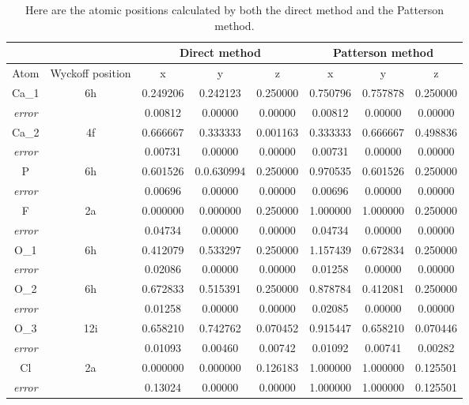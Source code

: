 \documentclass[]{scrartcl}
\begin{document}
\begin{table}[H]
	\centering
	\caption[Atomic positions]{Here are the atomic positions calculated by both the direct method and the Patterson method.}
	\begin{tabular}{c|c|c|c|c|c|c|c}
		&&\multicolumn{3}{c}{\cellcolor{Aquamarine} Direct method} & \multicolumn{3}{c}{\cellcolor{LimeGreen} Patterson method}\\
		\midrule
		Atom & Wyckoff position & x & y & z & x & y & z \\
		Ca\_1 & 6h & 0.249206 & 0.242123 & 0.250000 & 0.750796 & 0.757878 & 0.250000 \\
		\hline 
		\textit{error} & \ &  0.00812  &  0.00000  &  0.00000 &  0.00812  &  0.00000  &  0.00000   \\ 
		\hline
		
		Ca\_2 & 4f & 0.666667 & 0.333333 & 0.001163 & 0.333333 & 0.666667 & 0.498836 \\
		\hline
		\textit{error} & \ & 0.00731  &  0.00000 &   0.00000 & 0.00731  &  0.00000  &  0.00000 \\ 
		\hline
		P & 6h & 0.601526 & 0.0.630994 & 0.250000 & 0.970535 & 0.601526 & 0.250000 \\ 
		\hline
		\textit{error} & \ & 0.00696 &   0.00000 &   0.00000 & 0.00696 &   0.00000  &  0.00000 \\
		\hline
		F & 2a & 0.000000 & 0.000000 & 0.250000 & 1.000000 & 1.000000 & 0.250000 \\
		\hline
		\textit{error} & \ & 0.04734 &    0.00000 &   0.00000 & 0.04734 &   0.00000   & 0.00000 \\
		\hline 
		O\_1 & 6h & 0.412079 & 0.533297 & 0.250000 & 1.157439 & 0.672834 & 0.250000 \\
		\hline
		\textit{error} & \ & 0.02086 &   0.00000  &  0.00000 & 0.01258 &   0.00000 &   0.00000 \\
		\hline 
		O\_2 & 6h & 0.672833 & 0.515391 & 0.250000 & 0.878784 & 0.412081 & 0.250000 \\
		\hline
		\textit{error} & \ & 0.01258 &   0.00000 &   0.00000 & 0.02085 &   0.00000  &  0.00000 \\
		\hline 
		O\_3 & 12i & 0.658210 & 0.742762 & 0.070452 & 0.915447 & 0.658210 & 0.070446 \\
		\hline
		\textit{error} & \ & 0.01093 &    0.00460  &  0.00742 & 0.01092 &   0.00741  &  0.00282 \\
		\hline 
		Cl & 2a & 0.000000 & 0.000000 & 0.126183 & 1.000000 & 1.000000 & 0.125501 \\
		\hline
		\textit{error} & \ & 0.13024 &   0.00000 &   0.00000 & 1.000000  &   1.000000  &  0.125501 \\ 
		\hline
	\end{tabular}\label{atomicpos}
\end{table}
\end{document}
